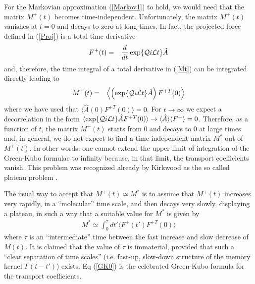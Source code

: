 \documentclass[b5paper,openright,11pt]{book}
\newcommand{\llangle}{\left\langle}
\newcommand{\rrangle}{\right\rangle}
\begin{document}
For the Markovian approximation (\ref{Markov1}) to hold, we would need
that the matrix  $M^+(t)$ becomes time-independent.   Unfortunately,  the  matrix
$M^+(t)$ vanishes at $t=0$ and decays to zero at long times. In
fact,  the projected  force defined  in (\ref{Proj})  is a  total time
derivative
\begin{eqnarray}
  F^+ (t)&=&\frac{d}{dt}\exp\{{\cal Q}i{\cal L}t\} \hat{A}  
\end{eqnarray}
and, therefore, the time integral  of a total derivative in (\ref{Mt})
can be integrated directly leading to
\begin{eqnarray}
M^+(t)&=&
  \llangle\left(\exp\{{\cal Q}i{\cal L}t\}  \hat{A}\right)F^{+T}(0)  \rrangle
\label{m+}
\end{eqnarray}
where we  have used that  $ \langle \hat{A} (0)  F^{+T}(0) \rangle=0$.
For  $t\to\infty$ we  expect a  decorrelation  in the  form $  \langle
\exp\{{\cal   Q}i{\cal  L}t\}   \hat{A}F^{+T}(0)  \rangle\to   \langle
\hat{A}\rangle \langle  F^+\rangle =0$.   Therefore, as a  function of
$t$, the matrix $M^+(t)$ starts from 0  and decays to 0 at large times
and, in  general, we do not  expect to find a  time-independent matrix
$M^*$  out  of  $M^+(t)$.   
In other words: one cannot extend  the upper limit of
integration of  the Green-Kubo formulae  to infinity because,  in that
limit, the transport  coefficients vanish. 
This problem  was  recognized  already  by
Kirkwood      as      the      so     called      plateau      problem
\cite{Kirkwood1949, Espanol1992}.

The usual  way to  accept that  $M^+(t)\simeq M^*$  is to  assume that
$M^+(t)$ increases  very rapidly, in  a ``molecular'' time  scale, and
then decays  very slowly, displaying a  plateau, in such a  way that a
suitable value for $M^*$ is given by
\begin{align}
  M^* \simeq \int_0^{\tau} dt'\langle F^+ (t') F^{+T}(0)\rangle 
\label{GK0}
\end{align}
where $\tau$ is an  ``intermediate'' time between  the fast
increase and slow decrease of $M(t)$.  It is claimed that the value of
$\tau$ is immaterial, provided that  such a ``clear separation of time
scales''  (i.e.  fast-up, slow-down  structure  of  the memory  kernel
$\Gamma(t-t')$) exists.  Eq (\ref{GK0})  is the  celebrated Green-Kubo
formula for the transport coefficients.
\end{document}
